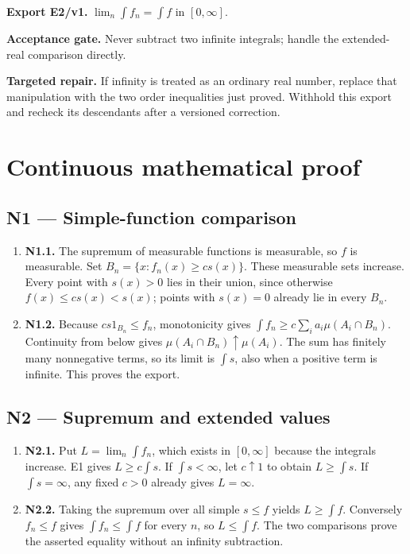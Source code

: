 \documentclass[preprint,12pt,aps,pra,showkeys,amsmath,amssymb,superscriptaddress,floatfix]{revtex4-2}
\theoremstyle{definition}
\theoremstyle{remark}
\newcommand{\field}[2]{\par\smallskip\noindent\textbf{#1.} #2\par}
\begin{document}
\field{Export E2/v1}{\(\lim_n\int f_n=\int f\) in \([0,\infty]\).}

\field{Acceptance gate}{Never subtract two infinite integrals; handle the extended-real
comparison directly.}

\field{Targeted repair}{If infinity is treated as an ordinary real number, replace that
manipulation with the two order inequalities just proved. Withhold this
export and recheck its descendants after a versioned correction.}

\endgroup\clearpage\section{Continuous mathematical proof}\label{sec:proof}

\subsection{N1 --- Simple-function
comparison}\label{n1-simple-function-comparison}

\begin{enumerate}
\def\labelenumi{\arabic{enumi}.}
\item
  \textbf{N1.1.} The supremum of measurable functions is measurable, so
  \(f\) is measurable. Set \(B_n=\{x:f_n(x)\ge c s(x)\}\). These
  measurable sets increase. Every point with \(s(x)>0\) lies in their
  union, since otherwise \(f(x)\le cs(x)<s(x)\); points with \(s(x)=0\)
  already lie in every \(B_n\).
\item
  \textbf{N1.2.} Because \(cs1_{B_n}\le f_n\), monotonicity gives
  \(\int f_n\ge c\sum_i a_i\mu(A_i\cap B_n)\). Continuity from below
  gives \(\mu(A_i\cap B_n)\uparrow\mu(A_i)\). The sum has finitely many
  nonnegative terms, so its limit is \(\int s\), also when a positive
  term is infinite. This proves the export.
\end{enumerate}

\subsection{N2 --- Supremum and extended
values}\label{n2-supremum-and-extended-values}

\begin{enumerate}
\def\labelenumi{\arabic{enumi}.}
\item
  \textbf{N2.1.} Put \(L=\lim_n\int f_n\), which exists in
  \([0,\infty]\) because the integrals increase. E1 gives
  \(L\ge c\int s\). If \(\int s<\infty\), let \(c\uparrow1\) to obtain
  \(L\ge\int s\). If \(\int s=\infty\), any fixed \(c>0\) already gives
  \(L=\infty\).
\item
  \textbf{N2.2.} Taking the supremum over all simple \(s\le f\) yields
  \(L\ge\int f\). Conversely \(f_n\le f\) gives \(\int f_n\le\int f\)
  for every \(n\), so \(L\le\int f\). The two comparisons prove the
  asserted equality without an infinity subtraction.
\end{enumerate}
\end{document}
